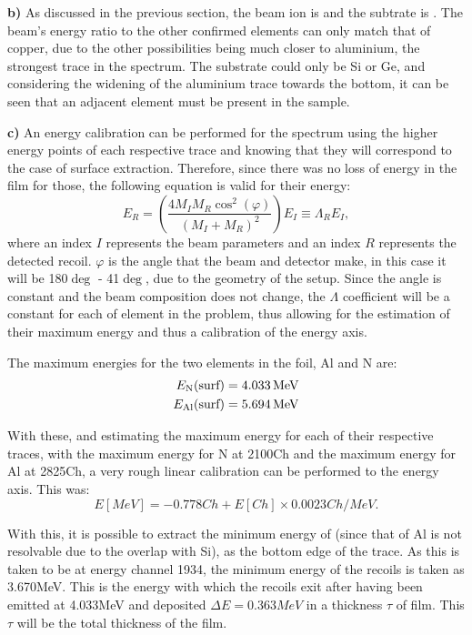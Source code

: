 \textbf{b)} As discussed in the previous section, the beam ion is  and the subtrate is . The beam's energy ratio to the other confirmed elements can only match that of copper, due to the other possibilities being much closer to aluminium, the strongest trace in the spectrum. The substrate could only be Si or Ge, and considering the widening of the aluminium trace towards the bottom, it can be seen that an adjacent element must be present in the sample. 

\textbf{c)} An energy calibration can be performed for the spectrum using the higher energy points of each respective trace and knowing that they will correspond to the case of surface extraction. Therefore, since there was no loss of energy in the film for those, the following equation is valid for their energy:
\begin{equation}
    E_R = \left(\frac{4M_IM_R \cos^2(\varphi)}{(M_I+M_R)^2}\right)E_I \equiv \Lambda_R E_I,
\end{equation} where an index $I$ represents the beam parameters and an index $R$ represents the detected recoil. $\varphi$ is the angle that the beam and detector make, in this case it will be 180$\deg$ - 41$\deg$, due to the geometry of the setup. Since the angle is constant and the beam composition does not change, the $\Lambda$ coefficient will be a constant for each of element in the problem, thus allowing for the estimation of their maximum energy and thus a calibration of the energy axis.

The maximum energies for the two elements in the foil, Al and N are: 
\begin{align}
    \label{eq:Emax}
    E_{\ce{N}}  (\text{surf}) = 4.033\unit{MeV}\\
    E_{\ce{Al}} (\text{surf}) = 5.694\unit{MeV}
\end{align}

With these, and estimating the maximum energy for each of their respective traces, with the maximum energy for N at 2100\unit{Ch} and the maximum energy for Al at 2825\unit{Ch}, a very rough linear calibration can be performed to the energy axis. This was:
\begin{equation}
    \label{eq:Ecal}
    E[MeV] = -0.778\unit{Ch} + E[Ch]\times0.0023\unit{Ch/MeV}.
\end{equation}

With this, it is possible to extract the minimum energy of  (since that of Al is not resolvable due to the overlap with Si), as the bottom edge of the  trace. As this is taken to be at energy channel 1934, the minimum energy of the  recoils is taken as 3.670\unit{MeV}. This is the energy with which the  recoils exit after having been emitted at 4.033\unit{MeV} and deposited $\Delta E = 0.363\unit{MeV}$ in a thickness $\tau$ of film. This $\tau$ will be the total thickness of the film. 

